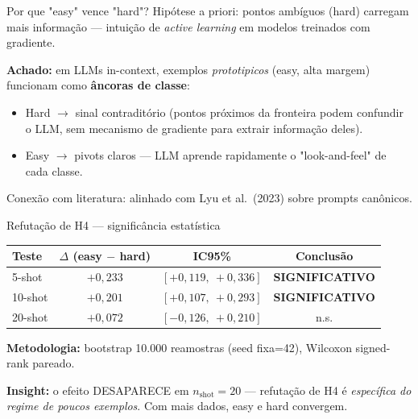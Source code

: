 \documentclass[aspectratio=169,10pt]{beamer}
\begin{document}
\begin{frame}{Por que "easy" vence "hard"?}
  \footnotesize
  Hip\'otese a priori: pontos amb\'iguos (hard) carregam mais informa\c{c}\~ao --- intui\c{c}\~ao de \emph{active learning} em modelos treinados com gradiente.
  \medskip

  \textbf{Achado:} em LLMs in-context, exemplos \emph{prototipicos} (easy, alta margem) funcionam como \textbf{\^ancoras de classe}:
  \begin{itemize}
    \item Hard $\to$ sinal contradit\'orio (pontos pr\'oximos da fronteira podem confundir o LLM, sem mecanismo de gradiente para extrair informa\c{c}\~ao deles).
    \item Easy $\to$ pivots claros --- LLM aprende rapidamente o "look-and-feel" de cada classe.
  \end{itemize}
  \medskip

  Conex\~ao com literatura: alinhado com Lyu et al.\ (2023) sobre prompts can\^onicos.
\end{frame}

\begin{frame}{Refuta\c{c}\~ao de H4 --- signific\^ancia estat\'istica}
  \scriptsize
  \begin{center}
  \begin{tabular}{lccc}
    \toprule
    Teste & $\Delta$ (easy $-$ hard) & IC95\% & Conclus\~ao \\
    \midrule
    5-shot  & $+0{,}233$ & $[+0{,}119,\ +0{,}336]$ & \textbf{SIGNIFICATIVO} \\
    10-shot & $+0{,}201$ & $[+0{,}107,\ +0{,}293]$ & \textbf{SIGNIFICATIVO} \\
    20-shot & $+0{,}072$ & $[-0{,}126,\ +0{,}210]$ & n.s. \\
    \bottomrule
  \end{tabular}
  \end{center}
  \medskip
  \textbf{Metodologia:} bootstrap 10.000 reamostras (seed fixa=42), Wilcoxon signed-rank pareado.
  \medskip

  \textbf{Insight:} o efeito DESAPARECE em $n_{\text{shot}}=20$ --- refuta\c{c}\~ao de H4 \'e \emph{espec\'ifica do regime de poucos exemplos}. Com mais dados, easy e hard convergem.
\end{frame}
\end{document}
